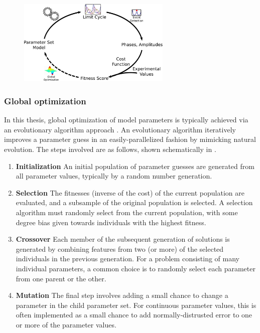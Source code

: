 \begin{figure}[tbp]
  \centering
  \includegraphics[width=0.65\textwidth]{chap1/figures/comp_loop.pdf}
  \label{fig:comploop}
\end{figure}

\subsubsection{Global optimization}
In this thesis, global optimization of model parameters is typically achieved via an evolutionary algorithm approach \cite{Whitley2001}. 
An evolutionary algorithm iteratively improves a parameter guess in an easily-parallelized fashion by mimicking natural evolution.
The steps involved are as follows, shown schematically in .
\begin{enumerate}
  \item {\bfseries Initialization} An initial population of parameter guesses are generated from all parameter values, typically by a random number generation.
  \item {\bfseries Selection} The fitnesses (inverse of the cost) of the current population are evaluated, and a subsample of the original population is selected. A selection algorithm must randomly select from the current population, with some degree bias given towards individuals with the highest fitness.
  \item {\bfseries Crossover} Each member of the subsequent generation of solutions is generated by combining features from two (or more) of the selected individuals in the previous generation. For a problem consisting of many individual parameters, a common choice is to randomly select each parameter from one parent or the other.
  \item {\bfseries Mutation} The final step involves adding a small chance to change a parameter in the child parameter set. For continuous parameter values, this is often implemented as a small chance to add normally-distrusted error to one or more of the parameter values.
\end{enumerate}

